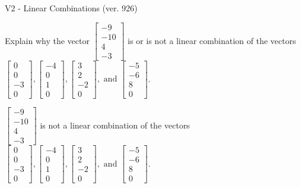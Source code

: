 \begin{exercise}
  \begin{exerciseTitle}V2 - Linear Combinations (ver. 926)\end{exerciseTitle}
  \begin{exerciseStatement}
    Explain why the vector \(\left[\begin{array}{c}
-9 \\
-10 \\
4 \\
-3
\end{array}\right]\)  is or is not a linear 
	combination of the vectors \(\left[\begin{array}{c}
0 \\
0 \\
-3 \\
0
\end{array}\right] , \left[\begin{array}{c}
-4 \\
0 \\
1 \\
0
\end{array}\right] , \left[\begin{array}{c}
3 \\
2 \\
-2 \\
0
\end{array}\right] , \text{ and } \left[\begin{array}{c}
-5 \\
-6 \\
8 \\
0
\end{array}\right]\).
	


  \end{exerciseStatement}
  \begin{exerciseAnswer}
   \(\left[\begin{array}{c}
-9 \\
-10 \\
4 \\
-3
\end{array}\right]\) 
  	 is not  
	a linear combination of the vectors \(\left[\begin{array}{c}
0 \\
0 \\
-3 \\
0
\end{array}\right] , \left[\begin{array}{c}
-4 \\
0 \\
1 \\
0
\end{array}\right] , \left[\begin{array}{c}
3 \\
2 \\
-2 \\
0
\end{array}\right] , \text{ and } \left[\begin{array}{c}
-5 \\
-6 \\
8 \\
0
\end{array}\right]\).


\end{exerciseAnswer}
\end{exercise}
